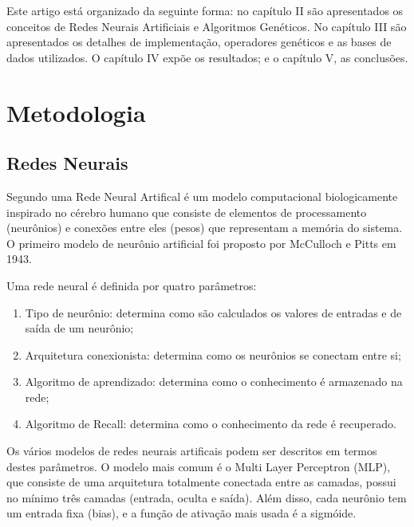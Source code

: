 \documentclass[12pt]{article}
\begin{document}
\par Este artigo está organizado da seguinte forma: no capítulo II são apresentados os conceitos de Redes Neurais Artificiais e Algoritmos Genéticos. No capítulo III são apresentados os detalhes de implementação, operadores genéticos e as bases de dados utilizados. O capítulo IV expõe os resultados; e o capítulo V, as conclusões.

\section{Metodologia} \label{sec:metodologia}

\subsection{Redes Neurais}

\par Segundo \cite{kasabov} uma Rede Neural Artifical é um modelo computacional biologicamente inspirado no cérebro humano que consiste de elementos de processamento (neurônios) e conexões entre eles (pesos) que representam a memória do sistema. O primeiro modelo de neurônio artificial foi proposto por McCulloch e Pitts em 1943. 
\par Uma rede neural é definida por quatro parâmetros:

\begin{enumerate}
	\item Tipo de neurônio: determina como são calculados os valores de entradas e de saída de um neurônio;
	\item Arquitetura conexionista: determina como os neurônios se conectam entre si;
	\item Algoritmo de aprendizado: determina como o conhecimento é armazenado na rede;
	\item Algoritmo de Recall: determina como o conhecimento da rede é recuperado.
\end{enumerate}

\par Os vários modelos de redes neurais artificais podem ser descritos em termos destes parâmetros. O modelo mais comum é o Multi Layer Perceptron (MLP), que consiste de uma arquitetura totalmente conectada entre as camadas, possui no mínimo três camadas (entrada, oculta e saída). Além disso, cada neurônio tem um entrada fixa (bias), e a função de ativação mais usada é a sigmóide.
\end{document}
